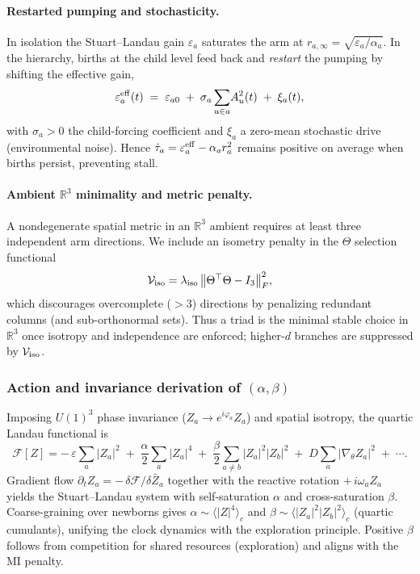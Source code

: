 \documentclass[11pt]{article}
\begin{document}
\paragraph{Restarted pumping and stochasticity.}
In isolation the Stuart--Landau gain $\varepsilon_a$ saturates the arm at $r_{a,\infty}=\sqrt{\varepsilon_a/\alpha_a}$.
In the hierarchy, births at the child level feed back and \emph{restart} the pumping by shifting the effective gain,
\begin{equation}
\varepsilon_a^{\rm eff}(t)\;=\;\varepsilon_{a0}\;+\;\sigma_a \sum_{u\in a}\!A_{u}^2(t)\;+\;\xi_a(t),
\end{equation}
with $\sigma_a>0$ the child-forcing coefficient and $\xi_a$ a zero-mean stochastic drive (environmental noise). Hence
$\dot\tau_a=\varepsilon_a^{\rm eff}-\alpha_a r_a^2$ remains positive on average when births persist, preventing stall.

\paragraph{Ambient $\mathbb R^3$ minimality and metric penalty.}
A nondegenerate spatial metric in an $\mathbb R^3$ ambient requires at least three independent arm directions.
We include an isometry penalty in the $\Theta$ selection functional
\begin{equation}
\mathcal V_{\rm iso} = \lambda_{\rm iso}\,\big\|\Theta^\top \Theta - I_{3}\big\|_F^2,
\end{equation}
which discourages overcomplete ($>3$) directions by penalizing redundant columns (and sub-orthonormal sets). Thus a triad is the minimal stable choice in $\mathbb R^3$ once isotropy and independence are enforced; higher-$d$ branches are suppressed by $\mathcal V_{\rm iso}$.

\subsubsection{Action and invariance derivation of $(\alpha,\beta)$}\label{subsub:alpha-beta-action}
Imposing $U(1)^3$ phase invariance ($Z_a\!\to\!e^{i\varphi_a}Z_a$) and spatial isotropy, the quartic Landau functional is
\begin{equation}
\mathcal F[Z] = -\,\varepsilon \sum_{a}|Z_a|^2 \;+\; \frac{\alpha}{2}\sum_a |Z_a|^4 \;+\; \frac{\beta}{2}\sum_{a\neq b} |Z_a|^2 |Z_b|^2 \;+\; D \sum_a |\nabla_\theta Z_a|^2 \;+\; \cdots.
\end{equation}
Gradient flow $\partial_t Z_a = -\,\delta \mathcal F/\delta \bar Z_a$ together with the reactive rotation $+\,i\omega_a Z_a$ yields the Stuart--Landau system with self-saturation $\alpha$ and cross-saturation $\beta$.
Coarse-graining over newborns gives $\alpha \sim \langle |Z|^4\rangle_c$ and $\beta \sim \langle |Z_a|^2 |Z_b|^2\rangle_c$ (quartic cumulants), unifying the clock dynamics with the exploration principle. Positive $\beta$ follows from competition for shared resources (exploration) and aligns with the MI penalty.
\end{document}
